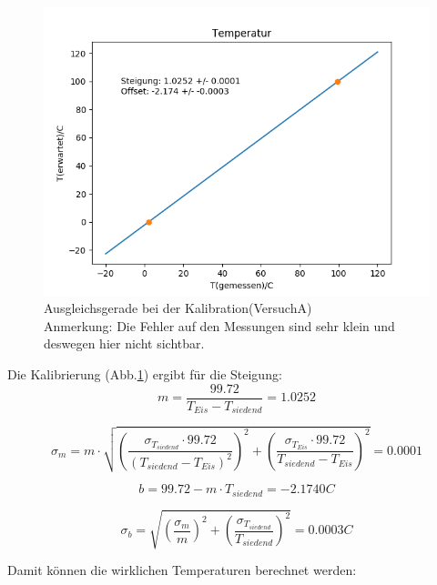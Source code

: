 \documentclass[12pt,a4paper]{article}
\begin{document}
\begin{figure}[H]
\begin{center}
\includegraphics[width=\linewidth]{Bilder/KalibrationA}
\caption[Gerade Kalibration A]{Ausgleichsgerade bei der Kalibration(VersuchA)\\
Anmerkung: Die Fehler auf den Messungen sind sehr klein und deswegen hier nicht sichtbar.}
\label{fig:GeradeKaliA}
\end{center}
\end{figure}


Die Kalibrierung (Abb.\ref{fig:GeradeKaliA}) ergibt für die Steigung:
\begin{equation}
m = \dfrac{99.72}{T_{Eis}-T_{siedend}} = 1.0252
\end{equation}

\begin{equation}
\sigma_{m} = m\cdot \sqrt{(\dfrac{\sigma_{T_{siedend}}\cdot 99.72}{(T_{siedend}-T_{Eis})^{2}})^{2}+(\dfrac{\sigma_{T_{Eis}}\cdot 99.72}{T_{siedend}-T_{Eis}})^{2}} = 0.0001
\end{equation}

\begin{equation}
b = 99.72-m\cdot T_{siedend} = -2.1740C
\end{equation}

\begin{equation}
\sigma_{b} = \sqrt{(\dfrac{\sigma_{m}}{m})^{2}+(\dfrac{\sigma_{T_{siedend}}}{T_{siedend}})^{2}} = 0.0003C
\end{equation}

Damit können die wirklichen Temperaturen berechnet werden:
\end{document}
